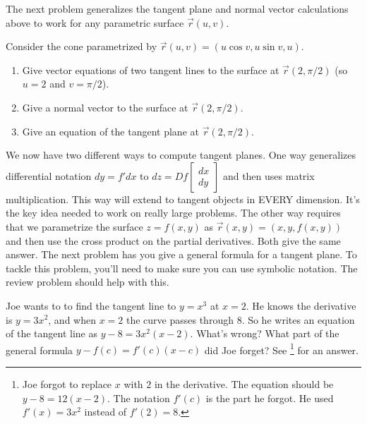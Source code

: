 The next problem generalizes the tangent plane and normal vector calculations above to work for any parametric surface $\vec r(u,v)$.
\begin{problem}%
%
 Consider the cone parametrized by $\vec r(u,v)=(u\cos v, u\sin v,u)$.
 \begin{enumerate}
 \item Give vector equations of two tangent lines to the surface at $\vec r(2,\pi/2)$ (so $u=2$ and $v=\pi/2$).
 \item Give a normal vector to the surface at $\vec r(2,\pi/2)$.
 \item Give an equation of the tangent plane at $\vec r(2,\pi/2)$.
 \end{enumerate}
\end{problem}


We now have two different ways to compute tangent planes.  One way generalizes differential notation $dy=f'dx$ to 
$dz = Df \begin{bmatrix}dx\\dy\end{bmatrix}$ and then uses matrix multiplication. This way will extend to tangent objects in EVERY dimension.  It's the key idea needed to work on really large problems.  The other way requires that we parametrize the surface $z=f(x,y)$ as $\vec r(x,y)=(x,y,f(x,y))$ and then use the cross product on the partial derivatives. Both give the same answer. The next problem has you give a general formula for a tangent plane.  To tackle this problem, you'll need to make sure you can use symbolic notation.  The review problem should help with this.

\begin{review*}
 Joe wants to to find the tangent line to $y=x^3$ at $x=2$.  He knows the derivative is $y=3x^2$, and when $x=2$ the curve passes through $8$.  So he writes an equation of the tangent line as $y-8=3x^2(x-2)$.  What's wrong?  What part of the general formula $y-f(c) = f'(c) (x-c)$ did Joe forget?  See \footnote{Joe forgot to replace $x$ with $2$ in the derivative. The equation should be $y-8=12(x-2)$.  The notation $f'(c)$ is the part he forgot.  He used $f'(x)=3x^2$ instead of $f'(2)=8$.} for an answer.

\end{review*}



